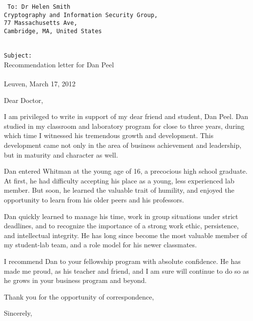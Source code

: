 \documentclass[a4paper,11pt]{article}
\begin{document}
\begin{multicols}{2}
\hfill\vfill
\columnbreak
{
\tt \fontsize{10.5}{14}
To: Dr Helen Smith\\
Cryptography and Information Security Group,\\
77 Massachusetts Ave,\\
Cambridge, MA, United States
\\\\
}
\end{multicols}

\begin{multicols}{2}
{\tt Subject:}\\ 
Recommendation letter for Dan Peel
\\\\
Leuven, March 17, 2012
\end{multicols}

Dear Doctor, 

I am privileged to write in support of my dear friend and student, Dan Peel. Dan studied in my classroom and
laboratory program for close to three years, during which time I witnessed his tremendous growth and development. This
development came not only in the area of business achievement and leadership, but in maturity and character as well.

Dan entered Whitman at the young age of 16, a precocious high school graduate. At first, he had difficulty accepting his
place as a young, less experienced lab member. But soon, he learned the valuable trait of humility, and enjoyed the
opportunity to learn from his older peers and his professors.

Dan quickly learned to manage his time, work in group situations under strict deadlines, and to recognize the importance
of a strong work ethic, persistence, and intellectual integrity. He has long since become the most valuable member of
my student-lab team, and a role model for his newer classmates.

I recommend Dan to your fellowship program with absolute confidence. He has made me proud, as his teacher and friend,
and I am sure will continue to do so as he grows in your business program and beyond.

Thank you for the opportunity of correspondence,

Sincerely,
\end{document}
